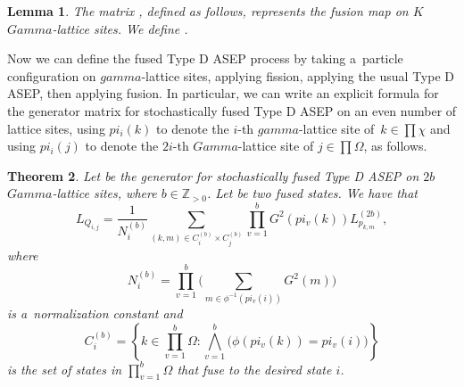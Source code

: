 \documentclass[10pt,a4paper]{amsart}
\numberwithin{equation}{section}
\newtheorem{Theorem}{Theorem}[section]
\newtheorem{Lemma}[Theorem]{Lemma}
\theoremstyle{definition}
\def\mathcal#1{#1}
\def\pi{pi}
\def\Gamma{Gamma}
\def\gamma{gamma}
\begin{document}
\begin{Lemma}
The matrix , defined as follows, represents the fusion map on $K$ $\Gamma$-lattice sites.
We define .
\end{Lemma}

Now we can define the fused Type D ASEP process by taking a~particle configuration on $\gamma$-lattice sites, applying fission, applying the usual Type D ASEP, then applying fusion. In particular, we can write an explicit formula for the generator matrix for stochastically fused Type D ASEP on an even number of lattice sites, using $\pi_i(k)$ to denote the $i$-th $\gamma$-lattice site of~${k \in \prod \chi}$ and using $\pi_i(j)$ to denote the $2i$-th $\Gamma$-lattice site of $j \in \prod \Omega$, as follows.
\begin{Theorem}\label{generator-function}
 Let  be the generator for stochastically fused Type D ASEP on $2b$ $\Gamma$-lattice sites, where $b \in \mathbb{Z}_{> 0}$. Let  be two fused states. We have that
 \[L_{Q_{i,j}} =\frac{1}{N_i^{(b)}}\sum_{(k,m) \in \mathcal{C}^{(b)}_i \times \mathcal{C}^{(b)}_j}\prod_{v=1}^b G^2(\pi_v(k)) L^{(2b)}_{p_{k,m}},
 \]
 where
 \[
 N_i^{(b)} = \prod_{v=1}^b \bigg(\sum_{m \in \phi^{-1}(\pi_v(i))}G^2(m)\bigg)
 \]
 is a~normalization constant and
 \[
 \mathcal{C}^{(b)}_i = \left\{k \in \prod_{v=1}^{b}\Omega \colon \bigwedge_{v=1}^{b}\bigl(\phi(\pi_v(k)) = \pi_v(i)\bigr)\right\}\]
 is the set of states in $\prod\limits_{v=1}^{b}\Omega$ that fuse to the desired state $i$.
\end{Theorem}
\end{document}
